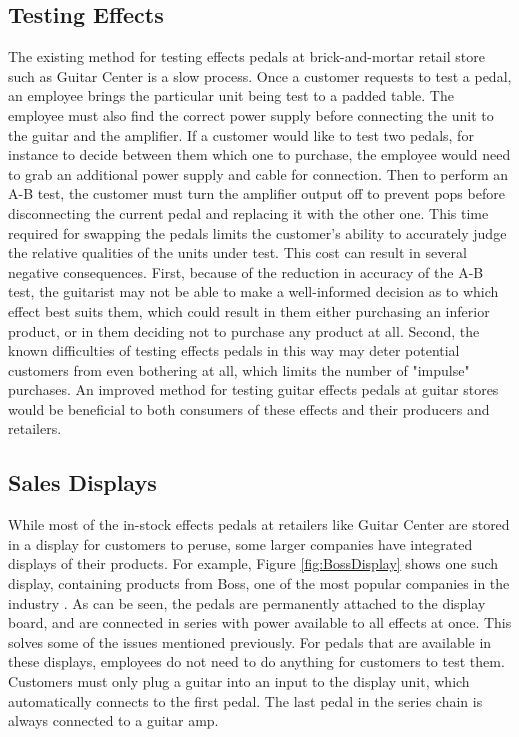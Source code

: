 \documentclass{article}
\begin{document}
	\subsection{Testing Effects}
	The existing method for testing effects pedals at brick-and-mortar retail store such as Guitar Center is a slow process.  Once a customer requests to test a pedal, an employee brings the particular unit being test to a padded table.  The employee must also find the correct power supply before connecting the unit to the guitar and the amplifier.  If a customer would like to test two pedals, for instance to decide between them which one to purchase, the employee would need to grab an additional power supply and cable for connection.  Then to perform an A-B test, the customer must turn the amplifier output off to prevent pops before disconnecting the current pedal and replacing it with the other one.  This time required for swapping the pedals limits the customer's ability to accurately judge the relative qualities of the units under test.  This cost can result in several negative consequences.  First, because of the reduction in accuracy of the A-B test, the guitarist may not be able to make a well-informed decision as to which effect best suits them, which could result in them either purchasing an inferior product, or in them deciding not to purchase any product at all.  Second, the known difficulties of testing effects pedals in this way may deter potential customers from even bothering at all, which limits the number of "impulse" purchases.  An improved method for testing guitar effects pedals at guitar stores would be beneficial to both consumers of these effects and their producers and retailers.

	\subsection{Sales Displays}
	While most of the in-stock effects pedals at retailers like Guitar Center are stored in a display for customers to peruse, some larger companies have integrated displays of their products.  For example, Figure \ref{fig:BossDisplay} shows one such display, containing products from Boss, one of the most popular companies in the industry \cite{ReverbMostPopular}.  As can be seen, the pedals are permanently attached to the display board, and are connected in series with power available to all effects at once.  This solves some of the issues mentioned previously.  For pedals that are available in these displays, employees do not need to do anything for customers to test them.  Customers must only plug a guitar into an input to the display unit, which automatically connects to the first pedal.  The last pedal in the series chain is always connected to a guitar amp.
\end{document}
